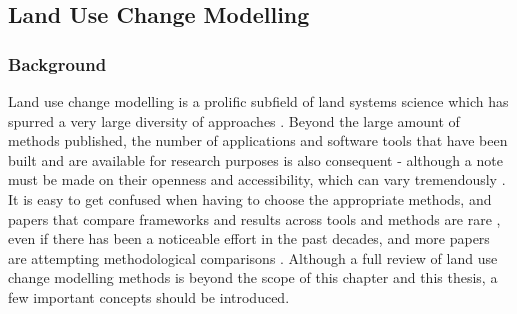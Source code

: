 \subsection{Land Use Change Modelling}

\subsubsection{Background}

Land use change modelling is a prolific subfield of land systems science which has spurred a very large diversity of approaches \citep{dang_review_2016, noszczyk_review_2018}. Beyond the large amount of methods published, the number of applications and software tools that have been built and are available for research purposes is also consequent - although a note must be made on their openness and accessibility, which can vary tremendously \citep{moulds_open_2015}. It is easy to get confused when having to choose the appropriate methods, and papers that compare frameworks and results across tools and methods are rare \citep{pontius_comparing_2008, pontius_comparison_2005}, even if there has been a noticeable effort in the past decades, and  more papers are attempting methodological comparisons \citep{sun_comparison_2018}. Although a full review of land use change modelling methods is beyond the scope of this chapter and this thesis, a few important concepts should be introduced.

